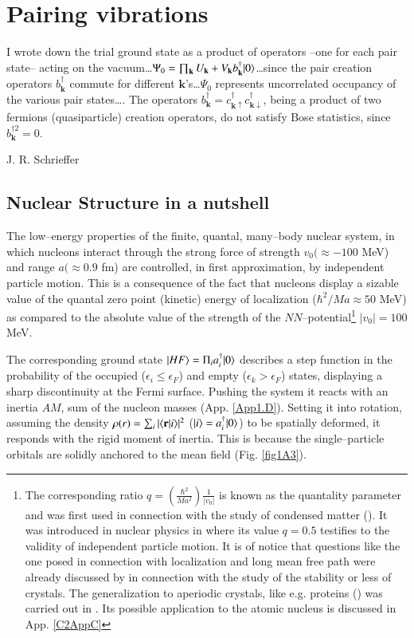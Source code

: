 \chapter{Pairing vibrations}\label{chapter1}
\epigraph{I wrote down the trial ground state as a product of operators --one for each pair state-- acting on the vacuum\dots \mbox{$\Psi_0=\prod_{\mathbf k}U_{\mathbf k}+V_{\mathbf k}b^\dagger_{\mathbf k}|{0} \rangle$}\dots since the pair creation operators $b^\dagger_{\mathbf k}$ commute for different $\mathbf k$'s\dots $\Psi_0$ represents uncorrelated occupancy of the various pair states\dots. The operators $b^\dagger_{\mathbf k}=c^\dagger_{\mathbf k\uparrow}c^\dagger_{\mathbf k\downarrow}$, being a product of two fermions (quasiparticle) creation operators, do not satisfy Bose statistics, since $b^{\dagger 2}_{\mathbf k}=0$.}{J. R. Schrieffer}
\section{Nuclear Structure in a nutshell}\label{C1S1}
The low--energy properties of the finite, quantal, many--body nuclear system, in which nucleons interact through the strong force of strength $v_0(\approx -100$ MeV) and range $a(\approx 0.9$ fm) are controlled, in first approximation, by independent particle motion. This is a consequence of the fact that nucleons display a sizable value of the quantal zero point (kinetic) energy of localization ($\hbar^2/Ma\approx 50$ MeV) as compared to the absolute value of the strength of the $NN$--potential\footnote{The corresponding ratio $q=\left(\frac{\hbar^2}{Ma^2}\right)\frac{1}{|v_0|}$ is known as the quantality parameter and was first used in connection with the study of condensed matter (\cite{deBoer:48,deBoer:57,deBoer:48b,Nosanow:76}). It  was introduced in nuclear physics in \cite{Mottelson:02} where its value $q=0.5$ testifies to the validity of independent particle motion. It is of notice that questions like the one posed in connection with localization and long mean free path were already discussed by \cite{Lindemann:10} in connection with the study of the stability or less of crystals. The generalization to aperiodic crystals, like e.g. proteins (\cite{Schrodinger:44}) was carried out in \cite{Stillinger:90}. Its possible application to the atomic nucleus is discussed in App. \ref{C2AppC} } $|v_0|=100$ MeV. 

The corresponding ground state $|{HF} \rangle=\Pi_ia^\dagger_i|{0} \rangle$ describes a step function in the probability of the occupied ($\epsilon_i\leq \epsilon_F$) and empty ($\epsilon_k>\epsilon_F$) states, displaying a sharp discontinuity at the Fermi surface. Pushing the system it reacts with an inertia $AM$, sum of the nucleon masses (App. \ref{App1.D}). Setting it into rotation, assuming the density $\rho(r)=\sum_i|\langle {\mathbf r|i} \rangle|^2$ ($|{i} \rangle=a^\dagger_i|{0} \rangle$) to be spatially deformed, it responds with the rigid moment of inertia. This is because the single--particle orbitals are solidly anchored to the mean field (Fig. \ref{fig1A3}).

